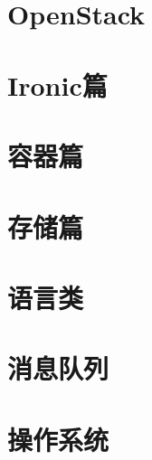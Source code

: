 \documentclass[openany,twoside]{book}
\begin{document}
\begin{titlepage}
    \\
    \vspace{\fill}
    \\
    \vspace{80mm}
\end{titlepage}

\newpage
\let\cleardoublepage\clearpage
\frontmatter
{
  \renewcommand*\contentsname{目录}
  \tableofcontents%
  \thispagestyle{empty}
}

\mainmatter

\part{OpenStack}


\part{Ironic篇}





\part{容器篇}




\part{存储篇}


\part{语言类}



\part{消息队列}

\part{操作系统}


\end{document}
